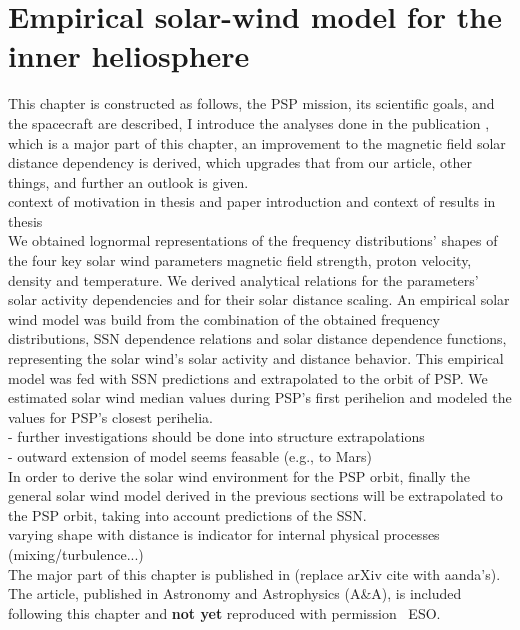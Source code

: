 
\chapter{Empirical solar-wind model for the inner heliosphere}
\label{chap:empirical_solar_wind_model_for_the_inner_heliosphere}

This chapter is constructed as follows, the PSP mission, its scientific goals, and the spacecraft are described, I introduce the analyses done in the publication \citet{Venzmer2017}, which is a major part of this chapter, an improvement to the magnetic field solar distance dependency is derived, which upgrades that from our article, other things, and further an outlook is given.\\

context of motivation in thesis and paper introduction and context of results in thesis\\

We obtained lognormal representations of the frequency distributions’ shapes of the four key solar wind parameters magnetic field strength, proton velocity, density and temperature. We derived analytical relations for the parameters’ solar activity dependencies and for their solar distance scaling. An empirical solar wind model was build from the combination of the obtained frequency distributions, SSN dependence relations and solar distance dependence functions, representing the solar wind’s solar activity and distance behavior. This empirical model was fed with SSN predictions and extrapolated to the orbit of PSP. We estimated solar wind median values during PSP’s first perihelion and modeled the values for PSP’s closest perihelia.\\
- further investigations should be done into structure extrapolations\\
- outward extension of model seems feasable (e.g., to Mars)\\
In order to derive the solar wind environment for the PSP orbit, finally the general solar wind model derived in the previous sections will be extrapolated to the PSP orbit, taking into account predictions of the SSN.\\
varying shape with distance is indicator for internal physical processes (mixing/turbulence...)\\



The major part of this chapter is published in \citet{Venzmer2017} (replace arXiv cite with aanda's). The article, published in Astronomy and Astrophysics (A\&A), is included following this chapter and \textbf{not yet} reproduced with permission \textcopyright~ESO.

